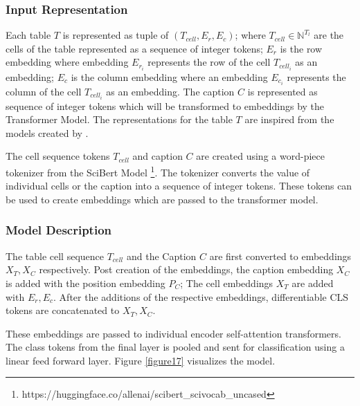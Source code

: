 \subsubsection{Input Representation}
\label{table_classification:models:encoder-model:input-rep}
Each table $T$ is represented as tuple of $(T_{cell},E_r,E_c)$; where $T_{cell} \in \mathbb{N}^{T_l}$ are the cells of the table represented as a sequence of integer tokens; $E_r$ is the row embedding where embedding $E_{r_{i}}$ represents the row of the cell $T_{cell_{i}}$ as an embedding;  $E_c$ is the column embedding where an embedding $E_{c_{i}}$ represents the column of the cell $T_{cell_{i}}$ as an embedding. The caption $C$ is represented as sequence of integer tokens which will be transformed to embeddings by the Transformer Model. The representations for the table $T$ are inspired from the models created by \cite{deng2020turl}. 

The cell sequence tokens $T_{cell}$ and caption $C$ are created using a word-piece tokenizer from the SciBert Model \footnote{https://huggingface.co/allenai/scibert\_scivocab\_uncased}. The tokenizer converts the value of individual cells or the caption into a sequence of integer tokens. These tokens can be used to create embeddings which are passed to the transformer model. 

\subsubsection{Model Description}
The table cell sequence $T_{cell}$ and the Caption $C$ are first converted to embeddings $X_T, X_C$ respectively. Post creation of the embeddings, the caption embedding  $X_C$ is added with the position embedding $P_C$; The cell embeddings $X_T$ are added with $E_r,E_c$. After the additions of the respective embeddings, differentiable CLS tokens are concatenated to $X_T,X_C$.

These embeddings are passed to individual encoder self-attention transformers. The class tokens from the final layer is pooled and sent for classification using a linear feed forward layer. Figure \ref{figure17} visualizes the model. 


